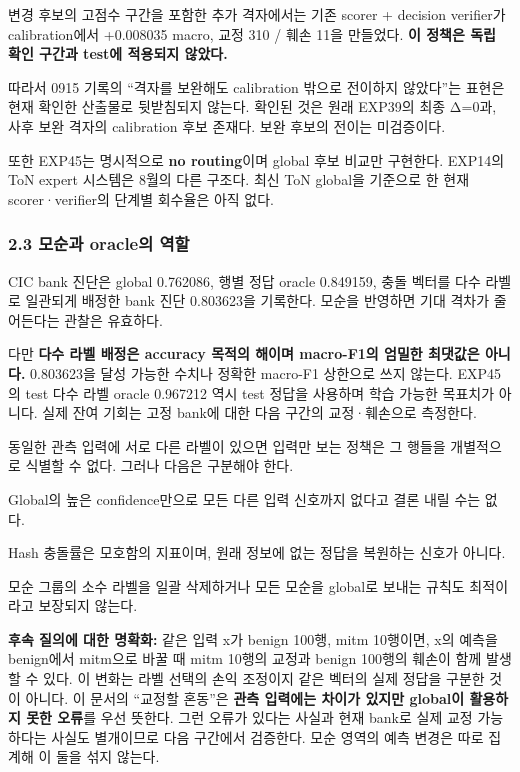 \par\noindent \textbullet\enspace 변경 후보의 고점수 구간을 포함한 추가 격자에서는 기존 scorer +\allowbreak{} decision verifier가 calibration에서 +\allowbreak{}0.008035 macro, 교정 310 /\allowbreak{} 훼손 11을 만들었다. \textbf{이 정책은 독립 확인 구간과 test에 적용되지 않았다.}


따라서 0915 기록의 “격자를 보완해도 calibration 밖으로 전이하지 않았다”는 표현은 현재 확인한 산출물로 뒷받침되지 않는다. 확인된 것은 원래 EXP39의 최종 Δ=\allowbreak{}0과, 사후 보완 격자의 calibration 후보 존재다. 보완 후보의 전이는 미검증이다.

또한 EXP45는 명시적으로 \textbf{no routing}이며 global 후보 비교만 구현한다. EXP14의 ToN expert 시스템은 8월의 다른 구조다. 최신 ToN global을 기준으로 한 현재 scorer·verifier의 단계별 회수율은 아직 없다.

\subsubsection{2.3 모순과 oracle의 역할}
CIC bank 진단은 global 0.762086, 행별 정답 oracle 0.849159, 충돌 벡터를 다수 라벨로 일관되게 배정한 bank 진단 0.803623을 기록한다. 모순을 반영하면 기대 격차가 줄어든다는 관찰은 유효하다.

다만 \textbf{다수 라벨 배정은 accuracy 목적의 해이며 macro-F1의 엄밀한 최댓값은 아니다.} 0.803623을 달성 가능한 수치나 정확한 macro-F1 상한으로 쓰지 않는다. EXP45의 test 다수 라벨 oracle 0.967212 역시 test 정답을 사용하며 학습 가능한 목표치가 아니다. 실제 잔여 기회는 고정 bank에 대한 다음 구간의 교정·훼손으로 측정한다.

동일한 관측 입력에 서로 다른 라벨이 있으면 입력만 보는 정책은 그 행들을 개별적으로 식별할 수 없다. 그러나 다음은 구분해야 한다.

\par\noindent \textbullet\enspace Global의 높은 confidence만으로 모든 다른 입력 신호까지 없다고 결론 내릴 수는 없다.


\par\noindent \textbullet\enspace Hash 충돌률은 모호함의 지표이며, 원래 정보에 없는 정답을 복원하는 신호가 아니다.


\par\noindent \textbullet\enspace 모순 그룹의 소수 라벨을 일괄 삭제하거나 모든 모순을 global로 보내는 규칙도 최적이라고 보장되지 않는다.


\textbf{후속 질의에 대한 명확화:} 같은 입력 x가 benign 100행, mitm 10행이면, x의 예측을 benign에서 mitm으로 바꿀 때 mitm 10행의 교정과 benign 100행의 훼손이 함께 발생할 수 있다. 이 변화는 라벨 선택의 손익 조정이지 같은 벡터의 실제 정답을 구분한 것이 아니다. 이 문서의 “교정할 혼동”은 \textbf{관측 입력에는 차이가 있지만 global이 활용하지 못한 오류}를 우선 뜻한다. 그런 오류가 있다는 사실과 현재 bank로 실제 교정 가능하다는 사실도 별개이므로 다음 구간에서 검증한다. 모순 영역의 예측 변경은 따로 집계해 이 둘을 섞지 않는다.

